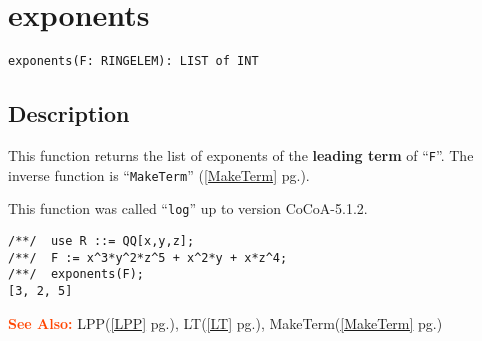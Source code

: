 \documentclass[a4paper]{mybook}
\newenvironment{command}{}{} %
\newcommand\SeeAlso{\par\textcolor{OrangeRed}{\textbf{\large See Also: }}}
\begin{document}
\section{exponents}
\label{exponents}
\begin{command} %


\begin{Verbatim}[label=syntax, rulecolor=\color{MidnightBlue},
frame=single]
exponents(F: RINGELEM): LIST of INT
\end{Verbatim}


\subsection*{Description}

This function returns the list of exponents of the \textbf{leading term} of ``\verb&F&''.
The inverse function is ``\verb&MakeTerm&'' (\ref{MakeTerm} pg.\pageref{MakeTerm}).
\par 
This function was called ``\verb&log&'' up to version CoCoA-5.1.2.
\begin{Verbatim}[label=example, rulecolor=\color{PineGreen}, frame=single]
/**/  use R ::= QQ[x,y,z];
/**/  F := x^3*y^2*z^5 + x^2*y + x*z^4;
/**/  exponents(F);
[3, 2, 5]
\end{Verbatim}


\SeeAlso %
  LPP(\ref{LPP} pg.\pageref{LPP}), 
    LT(\ref{LT} pg.\pageref{LT}), 
    MakeTerm(\ref{MakeTerm} pg.\pageref{MakeTerm})
\end{command} %
\end{document}
